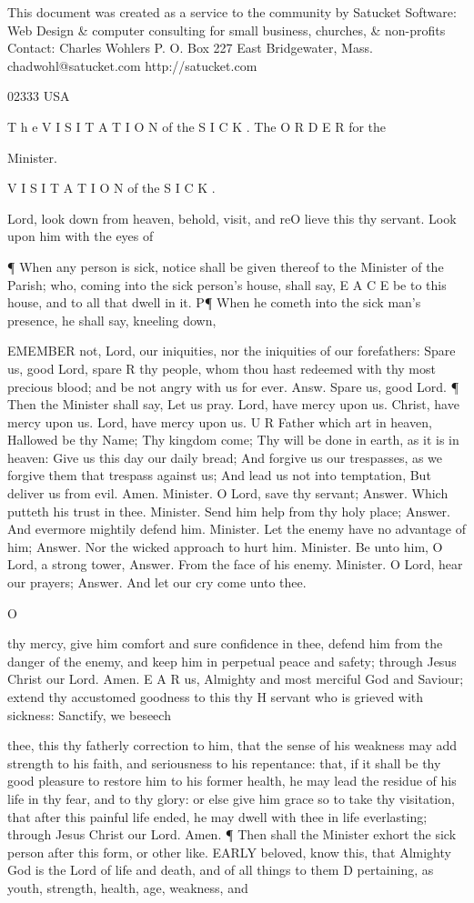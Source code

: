 This document was created as a service to the community by Satucket Software: Web Design \& computer consulting for small business, churches, \& non-profits Contact: Charles Wohlers P. O. Box 227 East Bridgewater, Mass. chadwohl@satucket.com http://satucket.com

02333 USA

T h e V I S I T A T I O N of the S I C K . The O R D E R for the

Minister.

V I S I T A T I O N of the S I C K .

Lord, look down from heaven, behold, visit, and reO lieve this thy servant. Look upon him with the eyes of

¶ When any person is sick, notice shall be given thereof to the Minister of the Parish; who, coming into the sick person’s house, shall say, E A C E be to this house, and to all that dwell in it. P¶ When he cometh into the sick man’s presence, he shall say, kneeling down,

EMEMBER not, Lord, our iniquities, nor the iniquities of our forefathers: Spare us, good Lord, spare R thy people, whom thou hast redeemed with thy most precious blood; and be not angry with us for ever. Answ. Spare us, good Lord. ¶ Then the Minister shall say, Let us pray. Lord, have mercy upon us. Christ, have mercy upon us. Lord, have mercy upon us. U R Father which art in heaven, Hallowed be thy Name; Thy kingdom come; Thy will be done in earth, as it is in heaven: Give us this day our daily bread; And forgive us our trespasses, as we forgive them that trespass against us; And lead us not into temptation, But deliver us from evil. Amen. Minister. O Lord, save thy servant; Answer. Which putteth his trust in thee. Minister. Send him help from thy holy place; Answer. And evermore mightily defend him. Minister. Let the enemy have no advantage of him; Answer. Nor the wicked approach to hurt him. Minister. Be unto him, O Lord, a strong tower, Answer. From the face of his enemy. Minister. O Lord, hear our prayers; Answer. And let our cry come unto thee.

O

thy mercy, give him comfort and sure confidence in thee, defend him from the danger of the enemy, and keep him in perpetual peace and safety; through Jesus Christ our Lord. Amen. E A R us, Almighty and most merciful God and Saviour; extend thy accustomed goodness to this thy H servant who is grieved with sickness: Sanctify, we beseech

thee, this thy fatherly correction to him, that the sense of his weakness may add strength to his faith, and seriousness to his repentance: that, if it shall be thy good pleasure to restore him to his former health, he may lead the residue of his life in thy fear, and to thy glory: or else give him grace so to take thy visitation, that after this painful life ended, he may dwell with thee in life everlasting; through Jesus Christ our Lord. Amen. ¶ Then shall the Minister exhort the sick person after this form, or other like. EARLY beloved, know this, that Almighty God is the Lord of life and death, and of all things to them D pertaining, as youth, strength, health, age, weakness, and

